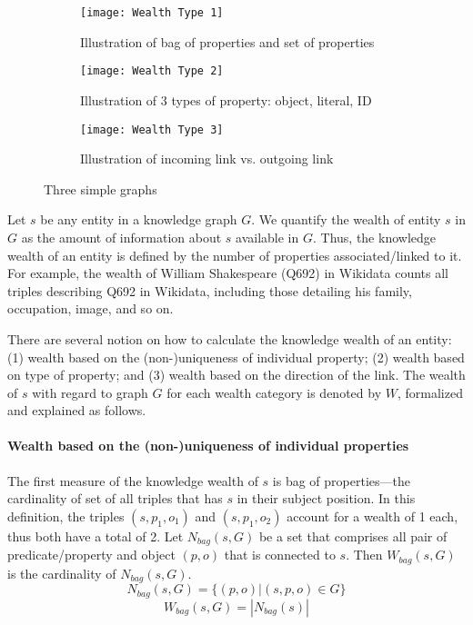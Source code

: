 \begin{figure}
     \centering
     \begin{subfigure}[b]{0.3\textwidth}
         \centering
         \texttt{[image: Wealth Type 1]}
         \caption{Illustration of bag of properties and set of properties}
         \label{fig:wealth-type1}
     \end{subfigure}
     \hfill
     \begin{subfigure}[b]{0.3\textwidth}
         \centering
         \texttt{[image: Wealth Type 2]}
         \caption{Illustration of 3 types of property: object, literal, ID}
         \label{fig:wealth-type2}
     \end{subfigure}
     \hfill
     \begin{subfigure}[b]{0.3\textwidth}
         \centering
         \texttt{[image: Wealth Type 3]}
         \caption{Illustration of incoming link vs. outgoing link}
         \label{fig:wealth-type3}
     \end{subfigure}
     \caption{Three simple graphs}
     \label{fig:three graphs}
\end{figure}

Let \(s\) be any entity in a knowledge graph \(G\). We quantify the wealth of entity \(s\) in \(G\) as the amount of information about \(s\) available in \(G\). Thus, the knowledge wealth of an entity is defined by the number of properties associated/linked to it. For example, the wealth of William Shakespeare (Q692) in Wikidata counts all triples describing Q692 in Wikidata, including those detailing his family, occupation, image, and so on.

There are several notion on how to calculate the knowledge wealth of an entity: (1) wealth based on the (non-)uniqueness of individual property; (2) wealth based on type of property; and (3) wealth based on the direction of the link. The wealth of \(s\) with regard to graph \(G\) for each wealth category is denoted by \(W\), formalized and explained as follows.

\paragraph{Wealth based on the (non-)uniqueness of individual properties}
The first measure of the knowledge wealth of \(s\) is bag of properties---the cardinality of set of all triples that has \(s\) in their subject position. In this definition, the triples \((s, p_1, o_1)\) and \((s, p_1, o_2)\) account for a wealth of 1 each, thus both have a total of 2.
Let \(N_{bag}(s,G)\) be a set that comprises all pair of predicate/property and object \((p,o)\) that is connected to \(s\). Then \(W_{bag}(s, G)\) is the cardinality of \(N_{bag}(s,G)\).
\[
    N_{bag}(s,G) = \{(p, o) | (s, p, o) \in G\}
\]
\[
    W_{bag}(s,G) = |N_{bag}(s)|
\]

